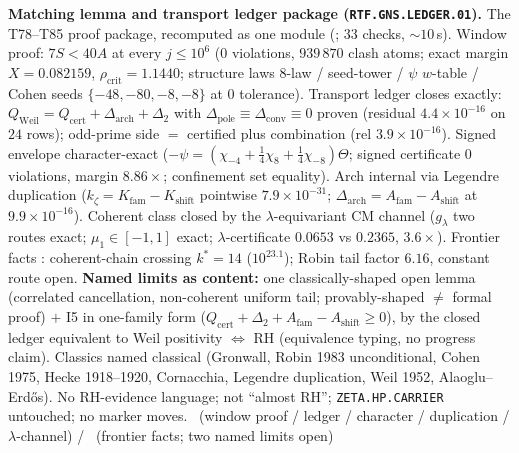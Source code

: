 \par\smallskip\noindent\textbf{Matching lemma and transport ledger package
(\texttt{RTF.GNS.LEDGER.01}).}
The T78--T85 proof package, recomputed as one module
(; $33$ checks, $\sim10$\,s).
Window proof: $7S<40A$ at every $j\le10^6$ ($0$ violations, $939\,870$ clash
atoms; exact margin $X=0.082159$, $\rho_{\mathrm{crit}}=1.1440$; structure laws
$8$-law / seed-tower / $\psi$ $w$-table / Cohen seeds $\{-48,-80,-8,-8\}$ at
$0$ tolerance). Transport ledger closes exactly:
$Q_{\mathrm{Weil}}=Q_{\mathrm{cert}}+\Delta_{\mathrm{arch}}+\Delta_2$ with
$\Delta_{\mathrm{pole}}\equiv\Delta_{\mathrm{conv}}\equiv0$ proven (residual
$4.4\times10^{-16}$ on $24$ rows); odd-prime side $=$ certified plus
combination (rel $3.9\times10^{-16}$). Signed envelope character-exact
($-\psi=(\chi_{-4}+\tfrac14\chi_8+\tfrac14\chi_{-8})\Theta$; signed
certificate $0$ violations, margin $8.86\times$; confinement set equality).
Arch internal via Legendre duplication
($k_\zeta=K_{\mathrm{fam}}-K_{\mathrm{shift}}$ pointwise $7.9\times10^{-31}$;
$\Delta_{\mathrm{arch}}=A_{\mathrm{fam}}-A_{\mathrm{shift}}$ at
$9.9\times10^{-16}$). Coherent class closed by the $\lambda$-equivariant CM
channel ($g_\lambda$ two routes exact; $\mu_1\in[-1,1]$ exact;
$\lambda$-certificate $0.0653$ vs $0.2365$, $3.6\times$).
Frontier facts \mC: coherent-chain crossing $k^*=14$ ($10^{23.1}$); Robin tail
factor $6.16$, constant route open. \textbf{Named limits as content:} one
classically-shaped open lemma (correlated cancellation, non-coherent uniform
tail; provably-shaped $\neq$ formal proof) $+$ I5 in one-family form
($Q_{\mathrm{cert}}+\Delta_2+A_{\mathrm{fam}}-A_{\mathrm{shift}}\ge0$),
by the closed ledger equivalent to Weil positivity $\Longleftrightarrow$ RH
(equivalence typing, no progress claim). Classics named classical (Gronwall,
Robin 1983 unconditional, Cohen 1975, Hecke 1918--1920, Cornacchia, Legendre
duplication, Weil 1952, Alaoglu--Erd\H{o}s). No RH-evidence language;
not ``almost RH''; \texttt{ZETA.HP.CARRIER} untouched; no marker moves.
\mE\ (window proof / ledger / character / duplication / $\lambda$-channel) /
\mC\ (frontier facts; two named limits open)
\par\smallskip


